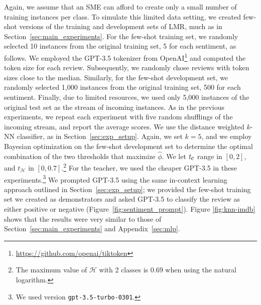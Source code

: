 \documentclass[11pt]{article}
\begin{document}
Again, we assume that an SME can afford to create only a small number of training instances per class. To simulate this limited data setting, we created few-shot versions of the training and development sets of LMR, much as in Section~\ref{sec:main_experiments}. For the few-shot training set, we randomly selected 10 instances from the original training set, 5 for each sentiment, as follows. We employed the GPT-3.5 tokenizer from OpenAI\footnote{\url{https://github.com/openai/tiktoken}} and computed the token size for each review. Subsequently, we randomly chose reviews with token sizes close to the median. Similarly, for the few-shot development set, we randomly selected 1,000 instances from the original training set, 500 for each sentiment. Finally, due to limited resources, we used only 5,000 instances of the original test set as the stream of incoming instances. As in the previous experiments, we repeat each experiment with five random shufflings of the incoming stream, and report the average scores. We use the distance weighted $k$-NN classifier, as in Section~\ref{sec:exp_setup}. Again, we set $k=5$, and we employ Bayesian optimization on the few-shot development set to determine the optimal combination of the two thresholds that maximize $\hat\phi$. We let $t_{\textrm{\small c}}$ range in $[0,2]$, and $t_\mathcal{H}$ in $[0,0.7]$.\footnote{The maximum  value of $\mathcal{H}$ with 2 classes is 0.69 when using the natural logarithm.} For the teacher, we used the cheaper GPT-3.5 in these experiments.\footnote{We used version \texttt{gpt-3.5-turbo-0301}.} We prompted GPT-3.5 using the same in-context learning approach outlined in Section~\ref{sec:exp_setup}; we provided the few-shot training set we created as demonstrators and asked GPT-3.5 to classify the review as either positive or negative (Figure~\ref{fig:sentiment_prompt}). Figure \ref{fig:knn-imdb} shows that the results were very similar to those of Section~\ref{sec:main_experiments} and Appendix~\ref{sec:mlp}.
\end{document}
